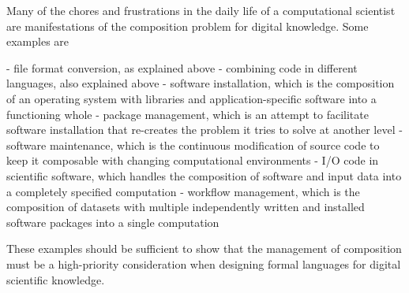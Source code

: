 Many of the chores and frustrations in the daily life of a computational scientist are manifestations of the composition problem for digital knowledge. Some examples are

 - file format conversion, as explained above
 - combining code in different languages, also explained above
 - software installation, which is the composition of an operating system with libraries and application-specific software into a functioning whole
 - package management, which is an attempt to facilitate software installation that re-creates the problem it tries to solve at another level
 - software maintenance, which is the continuous modification of source code to keep it composable with changing computational environments
 - I/O code in scientific software, which handles the composition of software and input data into a completely specified computation
 - workflow management, which is the composition of datasets with multiple independently written and installed software packages into a single computation

These examples should be sufficient to show that the management of composition must be a high-priority consideration when designing formal languages for digital scientific knowledge.
